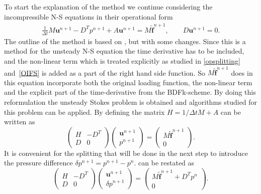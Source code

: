 To start the explanation of the method we continue considering the incompressible N-S equations in their 
operational form 
\begin{align}
    \frac{1}{\Delta t} M \mathbf{u}^{n+1}-D^Tp^{n+1}+A \mathbf{u}^{n+1} = M\mathbf{\tilde f}^{n+1},
    \qquad D\mathbf{u}^{n+1}    = 0.
    \label{eq:DiscreteStart}
\end{align}
The outline of the method is based on , but with some changes. Since this 
is a method for the unsteady N-S equation the time derivative has to be included, and the 
non-linear term which is treated explicitly as studied in \cref{opsplitting} and~\ref{OIFS}
is added as a part of the right hand side function. So $M\mathbf{\tilde f}^{n+1}$ does in this equation 
incorporate both the original loading function, the non-linear term and the explicit part of the 
time-derivative from the BDFk-scheme. 
By doing this reformulation the unsteady Stokes problem is obtained and algorithms studied 
for this problem can be applied.
By defining the matrix $H = 1/\Delta t M + A$  
can be written as 
\begin{equation}
\begin{pmatrix}
    H & -D^T \\ 
    D & 0
\end{pmatrix}
\begin{pmatrix}
    \mathbf{u}^{n+1}  \\ 
    p^{n+1} 
\end{pmatrix}
=
\begin{pmatrix}
    M\mathbf{\tilde f}^{n+1}  \\ 
    0 
    \end{pmatrix}.
    \label{eq:Matform}
\end{equation}
It is convenient for the splitting that will be done in the next step to introduce the 
pressure difference $\delta p^{n+1} = p^{n+1}-p^n$.  can be restated as 
\begin{equation}
\begin{pmatrix}
    H & -D^T \\ 
    D & 0
\end{pmatrix}
\begin{pmatrix}
    \mathbf{u}^{n+1}  \\ 
    \delta p^{n+1} 
\end{pmatrix}
=
\begin{pmatrix}
    M\mathbf{\tilde f}^{n+1} +D^Tp^n  \\ 
    0 
    \end{pmatrix}.
    \label{eq:Matform}
\end{equation}

